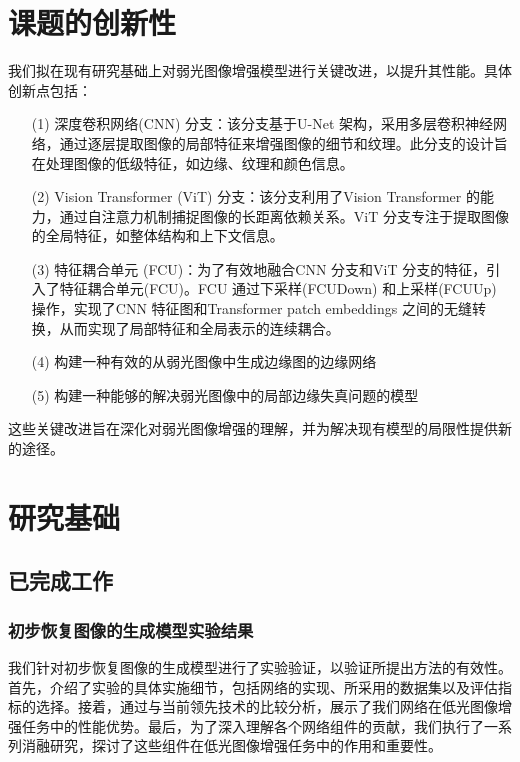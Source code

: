 \documentclass[a4paper]{ctexart}
\begin{document}
	\section{课题的创新性}
	
	我们拟在现有研究基础上对弱光图像增强模型进行关键改进，以提升其性能。具体创新点包括：
	
	\begin{itemize}
		\item [(1)] 深度卷积网络(CNN) 分支：该分支基于U-Net 架构，采用多层卷积神经网络，通过逐层提取图像的局部特征来增强图像的细节和纹理。此分支的设计旨在处理图像的低级特征，如边缘、纹理和颜色信息。
		
		\item [(2)] Vision Transformer (ViT) 分支：该分支利用了Vision Transformer 的能力，通过自注意力机制捕捉图像的长距离依赖关系。ViT 分支专注于提取图像的全局特征，如整体结构和上下文信息。
		
		\item [(3)] 特征耦合单元 (FCU)：为了有效地融合CNN 分支和ViT 分支的特征，引入了特征耦合单元(FCU)。FCU 通过下采样(FCUDown) 和上采样(FCUUp) 操作，实现了CNN 特征图和Transformer patch embeddings 之间的无缝转换，从而实现了局部特征和全局表示的连续耦合。
		
		\item [(4)] 构建一种有效的从弱光图像中生成边缘图的边缘网络
		
		\item [(5)] 构建一种能够的解决弱光图像中的局部边缘失真问题的模型
	\end{itemize}
	
	这些关键改进旨在深化对弱光图像增强的理解，并为解决现有模型的局限性提供新的途径。
	
	\section{研究基础}
	
	\subsection{已完成工作}
	
	\subsubsection{初步恢复图像的生成模型实验结果}
	
	我们针对初步恢复图像的生成模型进行了实验验证，以验证所提出方法的有效性。首先，介绍了实验的具体实施细节，包括网络的实现、所采用的数据集以及评估指标的选择。接着，通过与当前领先技术的比较分析，展示了我们网络在低光图像增强任务中的性能优势。最后，为了深入理解各个网络组件的贡献，我们执行了一系列消融研究，探讨了这些组件在低光图像增强任务中的作用和重要性。
	
\end{document}
